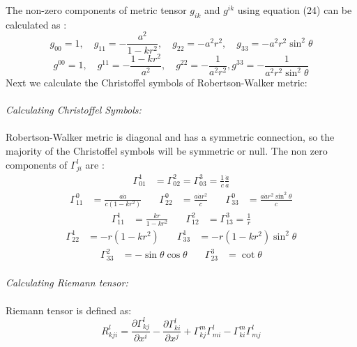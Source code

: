 \documentclass[14pt]{extarticle}
\begin{document}
The non-zero components of metric tensor $g_{i k}$ and $g^{i k}$ using equation (24) can be calculated as :\\
\begin{equation}
g_{00}=1, \quad g_{11}=-\frac{a^{2}}{1-k r^{2}}, \quad g_{22}=-a^{2} r^{2}, \quad g_{33}=-a^{2} r^{2} \sin ^{2} \theta
\end{equation}
\begin{equation}
g^{00}=1, \quad g^{11}=-\frac{1-k r^{2}}{a^{2}}, \quad g^{22}=-\frac{1}{a^{2} r^{2}},  g^{33}=-\frac{1}{a^{2} r^{2} \sin ^{2} \theta}
\end{equation}
Next we calculate the Christoffel symbols of Robertson-Walker metric:\\ \\
\textit{Calculating Christoffel Symbols:}\\ \\
Robertson-Walker  metric  is  diagonal  and has  a  symmetric  connection,  so  the  majority  of  the Christoffel symbols will be symmetric or null. The non zero components of $\Gamma_{j i}^{l}$ are :\\
\begin{align*}
\Gamma_{01}^{1}&=\Gamma_{02}^{2}=\Gamma_{03}^{3}=\frac{1}{c} \frac{\dot{a}}{a}
\end{align*}
\begin{align*}
\Gamma_{11}^{0}&=\frac{a \dot{a}}{c\left(1-k r^{2}\right)} &  \quad \Gamma_{22}^{0}&=\frac{a \dot{a} r^{2}}{c} &  \quad \Gamma_{33}^{0}&=\frac{a \dot{a} r^{2} \sin ^{2} \theta}{c}
\end{align*}
\begin{align*}
\Gamma_{11}^{1}&=\frac{k r}{1-k r^{2}} &  \quad \Gamma_{12}^{2}&=\Gamma_{13}^{3}=\frac{1}{r}
\end{align*}
\begin{align*}
\Gamma_{22}^{1}&=-r\left(1-k r^{2}\right) &  \quad \Gamma_{33}^{1}&=-r\left(1-k r^{2}\right) \sin ^{2} \theta
\end{align*}
\begin{align*}
\Gamma_{33}^{2}&=-\sin \theta \cos \theta &  \quad \Gamma_{23}^{3}&=\cot \theta
\end{align*}\\ 
\textit{Calculating Riemann tensor:}\\ \\
Riemann tensor is defined as:\\
\begin{equation}
R_{k j i}^{l} = \frac{\partial \Gamma_{k j}^{l}}{\partial x^{i}}-\frac{\partial \Gamma_{k i}^{l}}{\partial x^{j}}+\Gamma_{k j}^{m} \Gamma_{m i}^{l}-\Gamma_{k i}^{m} \Gamma_{m j}^{l}
\end{equation}
\end{document}
